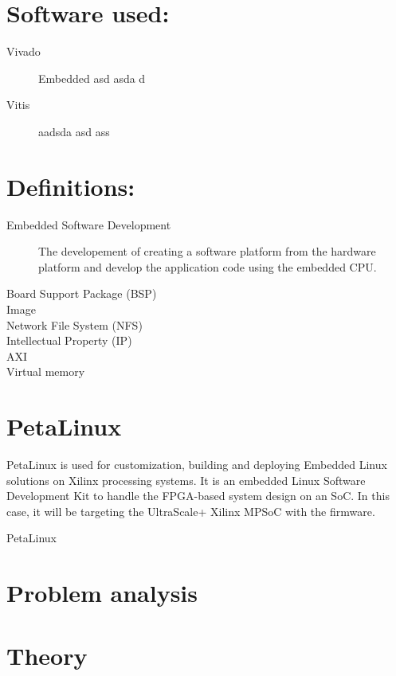 \section*{Software used:}
\begin{description}
    \item[Vivado] Embedded asd asda d
    \item[Vitis] aadsda asd ass
\end{description}

\section{Definitions:}

\begin{description}
    \item[Embedded Software Development] The developement of creating a software platform from the hardware platform and develop the application code using the embedded CPU.
    \item[Board Support Package (BSP)] 
    \item[Image]
    \item[Network File System (NFS)] 
    \item[Intellectual Property (IP)] 
    \item[AXI]
    \item[Virtual memory]
    \item[]
    
\end{description}

\section{PetaLinux}

PetaLinux is used for customization, building and deploying Embedded Linux solutions on Xilinx processing systems. It is an embedded Linux Software Development Kit to handle the FPGA-based system design on an SoC. In this case, it will be targeting the UltraScale+ Xilinx MPSoC with the firmware. 

PetaLinux 



\section{Problem analysis}
\section{Theory}
